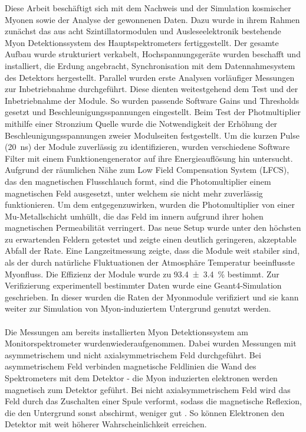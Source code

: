 Diese Arbeit besch\"aftigt sich mit dem Nachweis und der Simulation kosmischer Myonen sowie der Analyse der gewonnenen Daten.
Dazu wurde in ihrem Rahmen zun\"achst das aus acht Szintillatormodulen und Ausleseelektronik bestehende Myon Detektionssystem des Hauptspektrometers fertiggestellt. Der gesamte Aufbau wurde strukturiert verkabelt, Hochspannungsger\"ate wurden beschafft und installiert, die Erdung angebracht, Synchronisation mit dem Datennahmesystem des Detektors hergestellt.
Parallel wurden erste Analysen vorl\"aufiger Messungen zur Inbetriebnahme durchgef\"uhrt. Diese dienten weitestgehend dem Test und der Inbetriebnahme der Module. So wurden passende Software Gains und Thresholds gesetzt und Beschleunigungsspannungen eingestellt. Beim Test der Photmultiplier mithilfe einer Stronzium Quelle wurde die Notwendigkeit der Erh\"ohung der Beschleunigungsspannungen zweier Modulseiten festgestellt. Um die kurzen Pulse (\SI{20}{\nano\second}) der Module zuverl\"assig zu identifizieren, wurden verschiedene Software Filter mit einem Funktionengenerator auf ihre Energieaufl\"osung hin untersucht.
Aufgrund der r\"aumlichen N\"ahe zum Low Field Compensation System (LFCS), das den magnetischen Flusschlauch formt, sind die Photomultiplier einem magnetischen Feld ausgesetzt, unter welchem sie nicht mehr zuverl\"assig funktionieren. Um dem entgegenzuwirken, wurden die Photomultiplier von einer Mu-Metallschicht umh\"ullt, die das Feld im innern aufgrund ihrer hohen magnetischen Permeabilit\"at verringert. Das neue Setup wurde unter den h\"ochsten zu erwartenden Feldern getestet und zeigte einen deutlich geringeren, akzeptable Abfall der Rate.
Eine Langzeitmessung zeigte, dass die Module weit stabiler sind, als der durch nat\"urliche Fluktuationen der Atmosph\"are Temperatur beeinflusste Myonfluss. Die Effizienz der Module wurde zu \SI{93.4 \pm 3.4}{\percent} bestimmt.
Zur Verifizierung experimentell bestimmter Daten wurde eine Geant4-Simulation geschrieben. In dieser wurden die Raten der Myonmodule verifiziert und sie kann weiter zur Simulation von Myon-induziertem Untergrund genutzt werden.\\\\
Die Messungen am bereits installierten Myon Detektionssystem am Monitorspektrometer wurdenwiederaufgenommen. Dabei wurden Messungen mit asymmetrischem und nicht axialsymmetrischem Feld durchgef\"uhrt. Bei asymmetrischem Feld verbinden magnetische Feldlinien die Wand des Spektrometers mit dem Detektor - die Myon induzierten elektronen werden magnetisch zum Detektor gef\"uhrt. Bei nicht axialsymmetrischem Feld wird das Feld durch das Zuschalten einer Spule verformt, sodass die magnetische Reflexion, die den Untergrund sonst abschirmt, weniger gut . So k\"onnen Elektronen den Detektor mit weit h\"oherer Wahrscheinlichkeit erreichen. 
